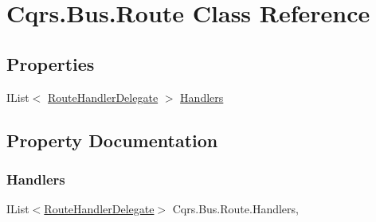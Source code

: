 \hypertarget{classCqrs_1_1Bus_1_1Route}{}\section{Cqrs.\+Bus.\+Route Class Reference}
\label{classCqrs_1_1Bus_1_1Route}
\subsection*{Properties}
\begin{DoxyCompactItemize}
\item 
I\+List$<$ \hyperlink{classCqrs_1_1Bus_1_1RouteHandlerDelegate}{Route\+Handler\+Delegate} $>$ \hyperlink{classCqrs_1_1Bus_1_1Route_ac82e93e4bb4667c9d1683d07c28d8b04}{Handlers}
\end{DoxyCompactItemize}


\subsection{Property Documentation}
\mbox{\label{classCqrs_1_1Bus_1_1Route_ac82e93e4bb4667c9d1683d07c28d8b04}} 
\subsubsection{\texorpdfstring{Handlers}{Handlers}}
{\footnotesize\ttfamily I\+List$<$\hyperlink{classCqrs_1_1Bus_1_1RouteHandlerDelegate}{Route\+Handler\+Delegate}$>$ Cqrs.\+Bus.\+Route.\+Handlers\hspace{0.3cm}{\ttfamily [get]}, {\ttfamily [set]}}

